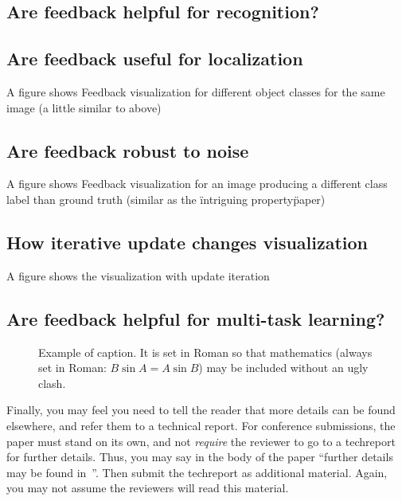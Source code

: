 \documentclass[10pt,twocolumn,letterpaper]{article}
\begin{document}
\subsection{Are feedback helpful for recognition?}

\subsection{Are feedback useful for localization}
A figure shows Feedback visualization for different object classes for the same image (a little similar to above)

\subsection{Are feedback robust to noise}
A figure shows Feedback visualization for an image producing a different class label than ground truth (similar as the \"intriguing property\" paper)

\subsection{How iterative update changes visualization}
A figure shows the visualization with update iteration

\subsection{Are feedback helpful for multi-task learning?}


\begin{figure}[t]
\begin{center}
\fbox{\rule{0pt}{2in} \rule{0.9\linewidth}{0pt}}
\end{center}
   \caption{Example of caption.  It is set in Roman so that mathematics
   (always set in Roman: $B \sin A = A \sin B$) may be included without an
   ugly clash.}
\label{fig:long}
\label{fig:onecol}
\end{figure}

Finally, you may feel you need to tell the reader that more details can be
found elsewhere, and refer them to a technical report.  For conference
submissions, the paper must stand on its own, and not {\em require} the
reviewer to go to a techreport for further details.  Thus, you may say in
the body of the paper ``further details may be found
in~\cite{Authors14b}''.  Then submit the techreport as additional material.
Again, you may not assume the reviewers will read this material.
\end{document}
